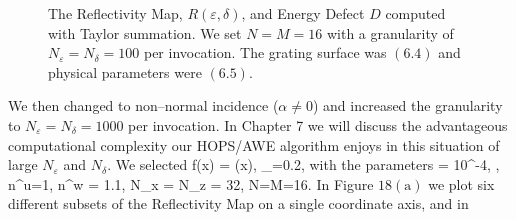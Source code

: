 %
\begin{figure}[H]
    \centering
    \vspace{3mm}
    \caption{The Reflectivity Map, $R(\varepsilon,\delta)$, and Energy Defect $D$
    computed with Taylor summation. We set $N=M=16$ 
    with a granularity of $N_{\varepsilon}=N_{\delta}=100$ per invocation. The grating surface was $(6.4)$ and physical parameters were $(6.5)$.}
    \label{Fig:RM:Dielectric}
\end{figure}
\vspace{-15mm}
We then changed to non--normal incidence ($\alpha \neq 0$) and increased the granularity to $N_{\varepsilon}=N_{\delta}=1000$ per invocation. In Chapter 7 we will discuss the advantageous computational complexity 
our HOPS/AWE algorithm enjoys in this situation of large $N_{\varepsilon}$ and $N_{\delta}$. We selected
\be
f(x) = \cos(x),
\quad
\varepsilon_{}=0.2,
\ee
with the parameters
\be
\alpha = 10^{-4},
\quad
{},
\quad
n^u=1,
\quad
n^w = 1.1,
\quad N_x = N_z = 32,
\quad N=M=16.
\ee
In Figure $18(\text{a})$ we plot six different subsets of the
Reflectivity Map on a single coordinate axis, and in 
